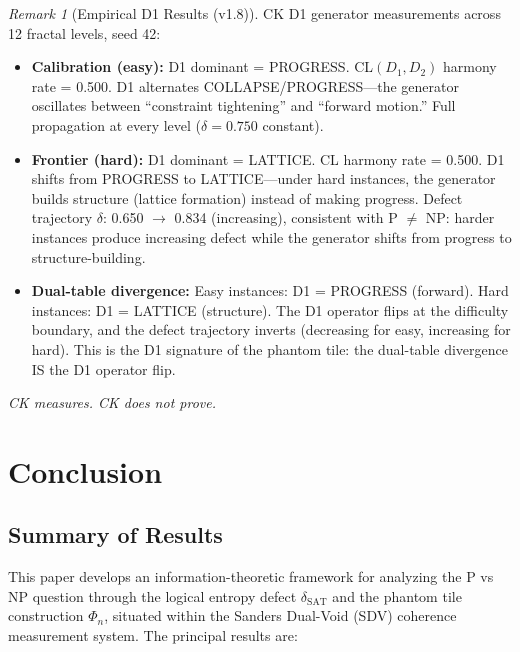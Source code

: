 \documentclass[11pt]{article}
\theoremstyle{definition}
\theoremstyle{remark}
\newtheorem{remark}[theorem]{Remark}
\newcommand{\dSAT}{\delta_{\mathrm{SAT}}}
\begin{document}
\begin{remark}[Empirical D1 Results (v1.8)]
CK D1 generator measurements across 12 fractal levels, seed 42:
\begin{itemize}[nosep]
  \item \textbf{Calibration (easy):} D1 dominant = PROGRESS. CL$(D_1,D_2)$ harmony rate = 0.500. D1 alternates COLLAPSE/PROGRESS---the generator oscillates between ``constraint tightening'' and ``forward motion.'' Full propagation at every level ($\delta = 0.750$ constant).
  \item \textbf{Frontier (hard):} D1 dominant = LATTICE. CL harmony rate = 0.500. D1 shifts from PROGRESS to LATTICE---under hard instances, the generator builds structure (lattice formation) instead of making progress. Defect trajectory $\delta$: 0.650 $\to$ 0.834 (increasing), consistent with P $\neq$ NP: harder instances produce increasing defect while the generator shifts from progress to structure-building.
  \item \textbf{Dual-table divergence:} Easy instances: D1 = PROGRESS (forward). Hard instances: D1 = LATTICE (structure). The D1 operator flips at the difficulty boundary, and the defect trajectory inverts (decreasing for easy, increasing for hard). This is the D1 signature of the phantom tile: the dual-table divergence IS the D1 operator flip.
\end{itemize}
\end{remark}

\bigskip

\noindent\textit{CK measures. CK does not prove.}

\section{Conclusion}
\label{sec:conclusion}

\subsection{Summary of Results}

This paper develops an information-theoretic framework for analyzing the
P vs NP question through the logical entropy defect $\dSAT$ and the
phantom tile construction $\Phi_n$, situated within the Sanders Dual-Void
(SDV) coherence measurement system.  The principal results are:
\end{document}
